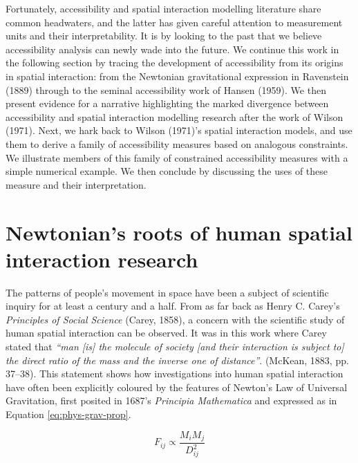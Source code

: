 \documentclass[
11pt, %
oneside, %
english, %
singlespacing, %
]{macthesis} %
\begin{document}
Fortunately, accessibility and spatial interaction modelling literature share common headwaters, and the latter has given careful attention to measurement units and their interpretability. It is by looking to the past that we believe accessibility analysis can newly wade into the future. We continue this work in the following section by tracing the development of accessibility from its origins in spatial interaction: from the Newtonian gravitational expression in Ravenstein (1889) through to the seminal accessibility work of Hansen (1959). We then present evidence for a narrative highlighting the marked divergence between accessibility and spatial interaction modelling research after the work of Wilson (1971). Next, we hark back to Wilson (1971)'s spatial interaction models, and use them to derive a family of accessibility measures based on analogous constraints. We illustrate members of this family of constrained accessibility measures with a simple numerical example. We then conclude by discussing the uses of these measure and their interpretation.

\section{Newtonian's roots of human spatial interaction research}\label{newtonians-roots-of-human-spatial-interaction-research}

The patterns of people's movement in space have been a subject of scientific inquiry for at least a century and a half. From as far back as Henry C. Carey's \emph{Principles of Social Science} (Carey, 1858), a concern with the scientific study of human spatial interaction can be observed. It was in this work where Carey stated that \emph{``man [is] the molecule of society [and their interaction is subject to] the direct ratio of the mass and the inverse one of distance''}. (McKean, 1883, pp. 37--38). This statement shows how investigations into human spatial interaction have often been explicitly coloured by the features of Newton's Law of Universal Gravitation, first posited in 1687's \emph{Principia Mathematica} and expressed as in Equation \ref{eq:phys-grav-prop}.

\begin{equation}
\label{eq:phys-grav-prop}
F_{ij} \propto \frac{M_i M_j} {D_{ij}^{2}}
\end{equation} 
\end{document}
